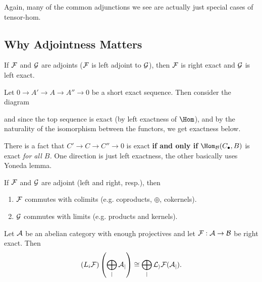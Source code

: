 \documentclass[12pt]{article}
\begin{document}
Again, many of the common adjunctions we see are actually just special cases of tensor-hom.

\subsection{Why Adjointness Matters}
\begin{lem}
	If $\cal F$ and $\cal G$ are adjoints ($\cal F$ is left adjoint to $\cal G$), then $\cal F$ is
	right exact and $\cal G$ is left exact.
\end{lem}
\begin{prf}
	Let $0\to A' \to A\to A''\to 0$ be a short exact sequence. Then consider the diagram
	\begin{center}
	\end{center}
	and since the top sequence is exact (by left exactness of $\Hom$), and by the naturality of the isomorphism
	between the functors, we get exactness below.
\end{prf}
\begin{rmk}
	There is a fact that $C'\to C\to C''\to 0$ is exact \textbf{if and only if} $\Hom_{\cal B}(C_\bullet,B)$ is 
	exact \textit{for all $B$.} One direction is just left exactness, the other basically uses Yoneda lemma.
\end{rmk}
\begin{thm}
	If $\cal F$ and $\cal G$ are adjoint (left and right, resp.), then
	\begin{enumerate}
		\item $\cal F$ commutes with colimits (e.g. coproducts, $\oplus$, cokernels).
		\item $\cal G$ commutes with limits (e.g. products and kernels).
	\end{enumerate}
\end{thm}
\begin{cor}
	Let $\cal A$ be an abelian category with enough projectives and let $\cal F:\cal A\to \cal B$ be right exact.
	Then
	\[(L_i\cal F)\left(\bigoplus_j A_j\right)\cong \bigoplus_j L_i\cal F(A_j).\]
\end{cor}
\end{document}
